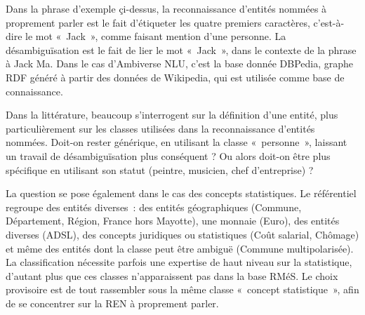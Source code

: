 \vspace{10pt}

Dans la phrase d'exemple çi-dessus, la reconnaissance d'entités nommées à proprement parler est le fait d'étiqueter les quatre premiers caractères, c'est-à-dire le mot «~Jack~», comme faisant mention d'une personne. La désambiguïsation est le fait de lier le mot «~Jack~», dans le contexte de la phrase à Jack Ma. Dans le cas d'Ambiverse NLU, c'est la base donnée DBPedia, graphe RDF généré à partir des données de Wikipedia, qui est utilisée comme base de connaissance.
\newline

Dans la littérature, beaucoup s'interrogent sur la définition d'une entité, plus particulièrement sur les classes utilisées dans la reconnaissance d'entités nommées. Doit-on rester générique, en utilisant la classe «~personne~», laissant un travail de désambiguïsation plus conséquent ? Ou alors doit-on être plus spécifique en utilisant son statut (peintre, musicien, chef d'entreprise) ?

La question se pose également dans le cas des concepts statistiques. Le référentiel regroupe des entités diverses~: des entités géographiques (Commune, Département, Région, France hors Mayotte), une monnaie (Euro), des entités diverses (ADSL), des concepts juridiques ou statistiques (Coût salarial, Chômage) et même des entités dont la classe peut être ambiguë (Commune multipolarisée). La classification nécessite parfois une expertise de haut niveau sur la statistique, d'autant plus que ces classes n'apparaissent pas dans la base RMéS. Le choix provisoire est de tout rassembler sous la même classe «~concept statistique~», afin de se concentrer sur la REN à proprement parler.
\label{section 2.1.2 - REN et Désambiguïsation}

